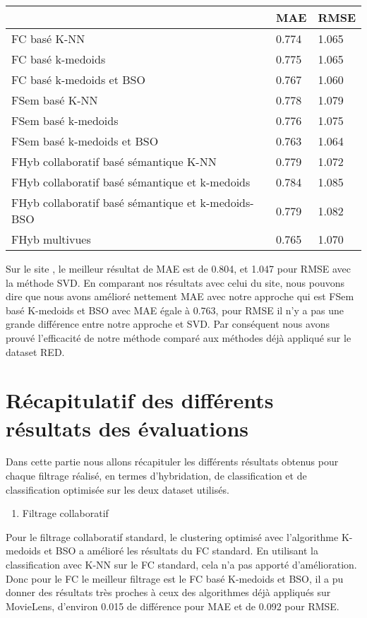 \begin{table}[H]
	\centering
	\begin{tabular}{|l|l|l|}
		\hline
		             & MAE & RMSE \\ \hline
		FC basé K-NN & 0.774 & 1.065 \\ \hline
		FC basé k-medoids & 0.775 & 1.065 \\ \hline
		FC basé k-medoids et BSO & 0.767 & 1.060 \\ \hline
		FSem basé K-NN & 0.778 & 1.079 \\ \hline
		FSem basé k-medoids & 0.776 & 1.075 \\ \hline
		FSem basé k-medoids et BSO & \cellcolor[HTML]{67FD9A}0.763 & \cellcolor[HTML]{67FD9A}1.064 \\ \hline
		FHyb collaboratif basé sémantique K-NN & 0.779 & 1.072 \\ \hline
		FHyb collaboratif basé sémantique  et k-medoids & 0.784 & 1.085 \\ \hline
		FHyb collaboratif basé sémantique et k-medoids-BSO & 0.779 & 1.082 \\ \hline
		FHyb multivues & 0.765 & 1.070 \\ \hline
	\end{tabular}
\end{table}
Sur le site \cite{ref43}, le meilleur résultat de MAE est de 0.804, et 1.047 pour RMSE avec la méthode SVD. En comparant nos résultats avec celui du site, nous pouvons dire que nous avons amélioré nettement MAE avec notre approche qui est FSem basé K-medoids et BSO avec MAE égale à 0.763, pour RMSE il n'y a pas une grande différence entre notre approche et SVD. Par conséquent nous avons prouvé l'efficacité de notre méthode comparé aux méthodes déjà appliqué sur le dataset RED.

\section{Récapitulatif des différents résultats des évaluations}
Dans cette partie nous allons récapituler les différents résultats obtenus pour chaque filtrage réalisé, en termes  d'hybridation, de classification et de classification optimisée sur les deux dataset utilisés.
\begin{enumerate}[nosep,label=\textbf{\arabic*)}]
	\item Filtrage collaboratif
\end{enumerate}\mbox{} \indent
Pour le filtrage collaboratif standard, le clustering optimisé avec l'algorithme K-medoids et BSO a amélioré les résultats du FC standard.
En utilisant la classification avec K-NN sur le FC standard, cela n'a pas apporté d'amélioration. Donc pour le FC le meilleur filtrage est le FC basé K-medoids et BSO, il a pu donner des résultats très proches à ceux des algorithmes déjà appliqués sur MovieLens, d'environ 0.015 de différence pour MAE et de 0.092 pour RMSE.\\

